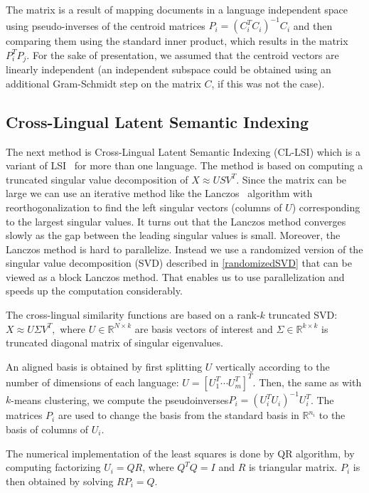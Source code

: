 \documentclass[twoside,11pt]{article}
\newcommand{\RR}{\mathbb{R}}
\begin{document}
The matrix is a result of mapping documents in a language independent space using pseudo-inverses of the centroid matrices $P_i = (C_i^T C_i)^{-1} C_i$ and then comparing them using the standard inner product, which results in the matrix $P_i^T P_j$. For the sake of presentation, we assumed that the centroid vectors are linearly independent (an independent subspace could be obtained using an additional Gram-Schmidt step on the matrix $C$, if this was not the case).

\subsection{Cross-Lingual Latent Semantic Indexing}

The next method is Cross-Lingual Latent Semantic Indexing (CL-LSI)\cite{cl_lsi} which is a variant of LSI~\cite{lsi} for more than one language. The method is based on computing a truncated singular value decomposition of $X \approx U S V^T$. Since the matrix can be large we can use an iterative method like the Lanczos~\cite{matrix_comp} algorithm with reorthogonalization to find the left singular vectors (columns of $U$) corresponding to the largest singular values. It turns out that the Lanczos method converges slowly as the gap between the leading singular values is small. Moreover, the Lanczos method is hard to parallelize. Instead we use a randomized version of the singular value decomposition (SVD) described in \ref{randomizedSVD} that can be viewed as a block Lanczos method. That enables us to use parallelization and speeds up the computation considerably.

The cross-lingual similarity functions are based on a rank-$k$ truncated SVD: $X \approx U \Sigma V^T,$ where $U \in \RR^{N \times k}$ are basis vectors of interest and $\Sigma \in \RR^{k \times k}$ is truncated diagonal matrix of singular eigenvalues.

An aligned basis is obtained by first splitting $U$ vertically according to the number of dimensions of each language: $U = [U_1^T \cdots U_m^T]^T$. Then, the same as with $k$-means clustering, we compute the pseudoinverses$P_i = (U_i^T U_i)^{-1} U_i^T$. The matrices $P_i$ are used to change the basis from the standard basis in $\RR^{n_i}$ to the basis of columns of $U_i$.

The numerical implementation of the least squares is done by QR algorithm, by computing factorizing $U_i = Q R$, where $Q^TQ = I$ and $R$ is triangular matrix. $P_i$ is then obtained by solving $R P_i = Q$.
\end{document}
